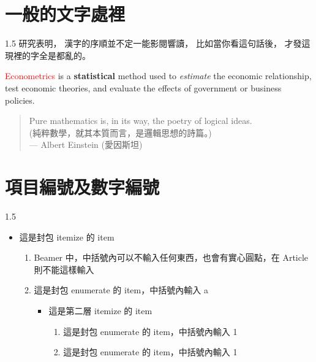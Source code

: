\documentclass[utf8,12pt]{article} %
\begin{document}
\section{一般的文字處裡}
\begin{spacing}{1.5}
%
研究表明，
漢字的序順並不定一能影閱響讀，
比如當你看這句話後，
才發這現裡的字全是都亂的。

\textcolor{red}{Econometrics} is a \textbf{statistical} method used to \textit{estimate} the economic relationship,
test economic theories, and evaluate the effects of government or business policies.

\begin{quote}
	Pure mathematics is, in its way, the poetry of logical ideas.\\
	(純粹數學，就其本質而言，是邏輯思想的詩篇。)\\
	--- Albert Einstein (愛因斯坦)
\end{quote}
%
\end{spacing}
%
%
\section{項目編號及數字編號}
\begin{spacing}{1.5}
%
\begin{itemize} %
\item 這是封包 itemize 的 item
		\begin{enumerate}[a] %
			\item Beamer 中，中括號內可以不輸入任何東西，也會有實心圓點，在 Article 則不能這樣輸入
			\item 這是封包 enumerate 的 item，中括號內輸入 a
			\begin{itemize} %
				\item 這是第二層 itemize 的 item
				\begin{enumerate}[1] %
					\item 這是封包 enumerate 的 item，中括號內輸入 1
					\item 這是封包 enumerate 的 item，中括號內輸入 1
				\end{enumerate}
			\end{itemize}
		\end{enumerate}
\end{itemize}
\end{spacing}
%
%
\end{document}

